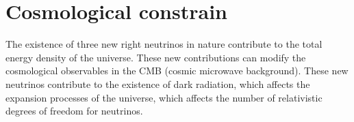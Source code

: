 \documentclass[12pt]{article}
\begin{document}
\section{Cosmological constrain}

The existence of three new right neutrinos in nature contribute to the total energy density of the universe. These new contributions can modify the cosmological observables in the CMB (cosmic microwave background). These new neutrinos contribute to the existence of dark radiation, which affects the expansion processes of the universe, which affects the number of relativistic degrees of freedom for neutrinos.
\end{document}
